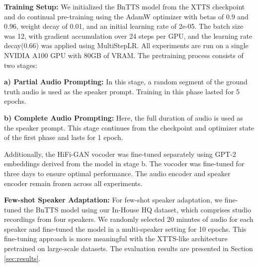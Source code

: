 
\noindent \textbf{Training Setup:} We initialized the BnTTS model from the XTTS checkpoint and do continual pre-training using the AdamW optimizer with betas of 0.9 and 0.96, weight decay of 0.01, and an initial learning rate of 2e-05. The batch size was 12, with gradient accumulation over 24 steps per GPU, and the learning rate decay(0.66) was applied using MultiStepLR. All experiments are run on a single NVIDIA A100 GPU with 80GB of VRAM. The pretraining process consists of two stages:

\textbf{a) Partial Audio Prompting:} In this stage, a random segment of the ground truth audio is used as the speaker prompt. Training in this phase lasted for 5 epochs.

\textbf{b) Complete Audio Prompting:} Here, the full duration of audio is used as the speaker prompt. This stage continues from the checkpoint and optimizer state of the first phase and lasts for 1 epoch.

Additionally, the HiFi-GAN vocoder was fine-tuned separately using GPT-2 embeddings derived from the model in stage b. The vocoder was fine-tuned for three days to ensure optimal performance. The audio encoder and speaker encoder remain frozen across all experiments.

\noindent \textbf{Few-shot Speaker Adaptation:} For few-shot speaker adaptation, we fine-tuned the BnTTS model using our In-House HQ dataset, which comprises studio recordings from four speakers. We randomly selected 20 minutes of audio for each speaker and fine-tuned the model in a multi-speaker setting for 10 epochs. This fine-tuning approach is more meaningful with the XTTS-like architecture pretrained on large-scale datasets. The evaluation results are presented in Section \ref{sec:results}.




